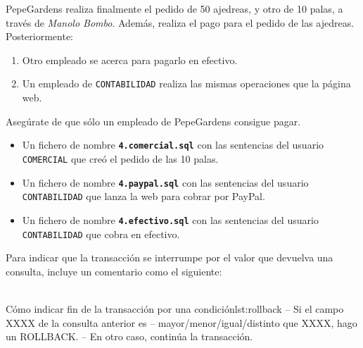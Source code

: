 \begin{homeworkProblem}
  PepeGardens realiza finalmente el pedido de 50 ajedreas, y otro de 10 palas, a través
  de \textit{Manolo Bombo}. Además, realiza el pago para el pedido de las ajedreas. Posteriormente:

  {

    \begin{enumerate}
    \item Otro empleado se acerca para pagarlo en efectivo.
    \item Un empleado de \texttt{CONTABILIDAD} realiza las mismas operaciones que la página web.
    \end{enumerate}
  }
  Asegúrate de que sólo un empleado de PepeGardens consigue pagar.
  \begin{Aviso}
    \begin{itemize}
    \item Un fichero de nombre \texttt{\textbf{4.comercial.sql}} con las sentencias del usuario \texttt{COMERCIAL} que creó el pedido de las 10 palas.
    \item Un fichero de nombre \texttt{\textbf{4.paypal.sql}}  con las sentencias del usuario \texttt{CONTABILIDAD} que lanza la web para cobrar por PayPal.
    \item Un fichero de nombre \texttt{\textbf{4.efectivo.sql}}  con las sentencias del usuario \texttt{CONTABILIDAD} que cobra en efectivo.
    \end{itemize}

    Para indicar que la transacción se interrumpe por el valor que devuelva una consulta, incluye un comentario como el siguiente:
    \\
    \\
\begin{listadosql}{Cómo indicar fin de la transacción por una condición}{lst:rollback}
-- Si el campo XXXX de la consulta anterior es
-- mayor/menor/igual/distinto que XXXX, hago un ROLLBACK.
-- En otro caso, continúa la transacción.
\end{listadosql}
    

  \end{Aviso}

\end{homeworkProblem}



